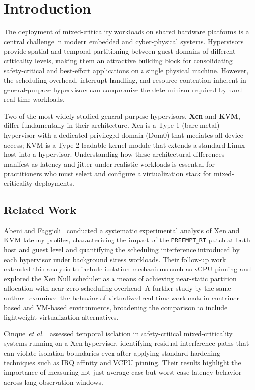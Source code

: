 \section{Introduction}
\label{sec:intro}

The deployment of mixed-criticality workloads on shared hardware platforms is
a central challenge in modern embedded and cyber-physical systems.
Hypervisors provide spatial and temporal partitioning between guest domains of
different criticality levels, making them an attractive building block for
consolidating safety-critical and best-effort applications on a single physical
machine.
However, the scheduling overhead, interrupt handling, and resource contention
inherent in general-purpose hypervisors can compromise the determinism required
by hard real-time workloads.

Two of the most widely studied general-purpose hypervisors, \textbf{Xen} and
\textbf{KVM}, differ fundamentally in their architecture.
Xen is a Type-1 (bare-metal) hypervisor with a dedicated privileged domain
(Dom0) that mediates all device access; KVM is a Type-2 loadable kernel module
that extends a standard Linux host into a hypervisor.
Understanding how these architectural differences manifest as latency and jitter
under realistic workloads is essential for practitioners who must select and
configure a virtualization stack for mixed-criticality deployments.


\subsection{Related Work}
\label{sec:related}

Abeni and Faggioli~\cite{abeni2019} conducted a systematic experimental
analysis of Xen and KVM latency profiles, characterizing the impact of the
\texttt{PREEMPT\_RT} patch at both host and guest level and quantifying the
scheduling interference introduced by each hypervisor under background stress
workloads.
Their follow-up work~\cite{abeni2020} extended this analysis to include
isolation mechanisms such as vCPU pinning and explored the Xen Null scheduler
as a means of achieving near-static partition allocation with near-zero
scheduling overhead.
A further study by the same author~\cite{abeni2024} examined the behavior of
virtualized real-time workloads in container-based and VM-based environments,
broadening the comparison to include lightweight virtualization alternatives.

Cinque~\emph{et al.}~\cite{cinque2024} assessed temporal isolation in
safety-critical mixed-criticality systems running on a Xen hypervisor,
identifying residual interference paths that can violate isolation boundaries
even after applying standard hardening techniques such as IRQ affinity and
VCPU pinning.
Their results highlight the importance of measuring not just average-case
but worst-case latency behavior across long observation windows.

